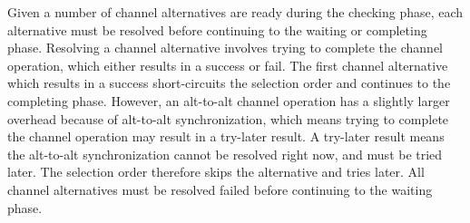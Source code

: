 Given a number of channel alternatives are ready during the checking phase, each alternative must be resolved before continuing to the waiting or completing phase. Resolving a channel alternative involves trying to complete the channel operation, which either results in a success or fail. The first channel alternative which results in a success short\hyp{}circuits the selection order and continues to the completing phase. However, an alt\hyp{}to\hyp{}alt channel operation has a slightly larger overhead because of alt\hyp{}to\hyp{}alt synchronization, which means trying to complete the channel operation may result in a try\hyp{}later result. A try\hyp{}later result means the alt\hyp{}to\hyp{}alt synchronization cannot be resolved right now, and must be tried later. The selection order therefore skips the alternative and tries later. All channel alternatives must be resolved failed before continuing to the waiting phase.



